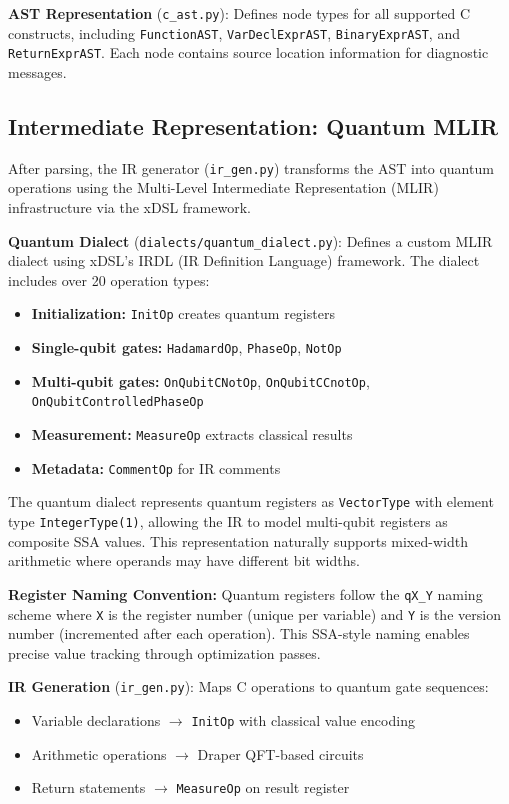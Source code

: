 \documentclass[a4paper,twocolumn]{article}
\begin{document}
\textbf{AST Representation} (\texttt{c\_ast.py}): Defines node types for all supported C constructs, including \texttt{FunctionAST},
\texttt{VarDeclExprAST}, \texttt{BinaryExprAST}, and \texttt{ReturnExprAST}. Each node contains source location information for
diagnostic messages.

\subsection{Intermediate Representation: Quantum MLIR}

After parsing, the IR generator (\texttt{ir\_gen.py}) transforms the AST into quantum operations using the Multi-Level Intermediate
Representation (MLIR) infrastructure via the xDSL framework.

\textbf{Quantum Dialect} (\texttt{dialects/quantum\_dialect.py}): Defines a custom MLIR dialect using
xDSL's IRDL (IR Definition Language) framework. The dialect includes over 20 operation types:
\begin{itemize}
  \item \textbf{Initialization:} \texttt{InitOp} creates quantum registers
  \item \textbf{Single-qubit gates:} \texttt{HadamardOp}, \texttt{PhaseOp}, \texttt{NotOp}
  \item \textbf{Multi-qubit gates:} \texttt{OnQubitCNotOp}, \texttt{OnQubitCCnotOp}, \texttt{OnQubitControlledPhaseOp}
  \item \textbf{Measurement:} \texttt{MeasureOp} extracts classical results
  \item \textbf{Metadata:} \texttt{CommentOp} for IR comments
\end{itemize}

The quantum dialect represents quantum registers as \texttt{VectorType} with element type \texttt{IntegerType(1)},
allowing the IR to model multi-qubit registers as composite SSA values. This representation naturally supports mixed-width
arithmetic where operands may have different bit widths.

\textbf{Register Naming Convention:} Quantum registers follow the \texttt{qX\_Y} naming scheme where \texttt{X} is the
register number (unique per variable) and \texttt{Y} is the version number (incremented after each operation).
This SSA-style naming enables precise value tracking through optimization passes.

\textbf{IR Generation} (\texttt{ir\_gen.py}): Maps C operations to quantum gate sequences:
\begin{itemize}
  \item Variable declarations $\rightarrow$ \texttt{InitOp} with classical value encoding
  \item Arithmetic operations $\rightarrow$ Draper QFT-based circuits
  \item Return statements $\rightarrow$ \texttt{MeasureOp} on result register
\end{itemize}
\end{document}
